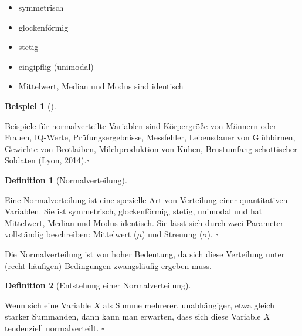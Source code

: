 \documentclass[
  letterpaper,
]{scrbook}
\providecommand{\tightlist}{%
  \setlength{\itemsep}{0pt}\setlength{\parskip}{0pt}}\usepackage{longtable,booktabs,array}
\theoremstyle{definition}
\newtheorem{example}{Beispiel}[chapter]
\theoremstyle{definition}
\newtheorem{definition}{Definition}[chapter]
\theoremstyle{definition}
\theoremstyle{remark}
\begin{document}
\begin{itemize}
\tightlist
\item
  symmetrisch
\item
  glockenförmig
\item
  stetig
\item
  eingipflig (unimodal)
\item
  Mittelwert, Median und Modus sind identisch
\end{itemize}

\begin{example}[]\protect\hypertarget{exm-norm}{}\label{exm-norm}

Beispiele für normalverteilte Variablen sind Körpergröße von Männern
oder Frauen, IQ-Werte, Prüfungsergebnisse, Messfehler, Lebensdauer von
Glühbirnen, Gewichte von Brotlaiben, Milchproduktion von Kühen,
Brustumfang schottischer Soldaten (Lyon, 2014).\(\square\)

\end{example}

\begin{definition}[Normalverteilung]\protect\hypertarget{def-norm}{}\label{def-norm}

Eine Normalverteilung ist eine spezielle Art von Verteilung einer
quantitativen Variablen. Sie ist symmetrisch, glockenförmig, stetig,
unimodal und hat Mittelwert, Median und Modus identisch. Sie lässt sich
durch zwei Parameter vollständig beschreiben: Mittelwert (\(\mu\)) und
Streuung (\(\sigma\)). \(\square\)

\end{definition}

Die Normalverteilung ist von hoher Bedeutung, da sich diese Verteilung
unter (recht häufigen) Bedingungen zwangsläufig ergeben muss.

\begin{definition}[Entstehung einer
Normalverteilung]\protect\hypertarget{def-normal-galton}{}\label{def-normal-galton}

Wenn sich eine Variable \(X\) als Summe mehrerer, unabhängiger, etwa
gleich starker Summanden, dann kann man erwarten, dass sich diese
Variable \(X\) tendenziell normalverteilt. \(\square\)

\end{definition}
\end{document}

